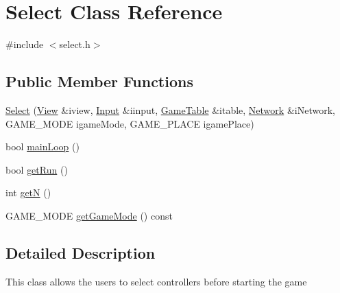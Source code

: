 \hypertarget{class_select}{\section{Select Class Reference}
\label{class_select}
}


{\ttfamily \#include $<$select.\-h$>$}

\subsection*{Public Member Functions}
\begin{DoxyCompactItemize}
\item 
\hyperlink{class_select_a690e07f6c8de112fda9d8a586faf0c26}{Select} (\hyperlink{class_view}{View} \&iview, \hyperlink{class_input}{Input} \&iinput, \hyperlink{class_game_table}{Game\-Table} \&itable, \hyperlink{class_network}{Network} \&i\-Network, G\-A\-M\-E\-\_\-\-M\-O\-D\-E igame\-Mode, G\-A\-M\-E\-\_\-\-P\-L\-A\-C\-E igame\-Place)
\item 
bool \hyperlink{class_select_a59168f64ef8318b41ed37206fd12342e}{main\-Loop} ()
\item 
bool \hyperlink{class_select_a6596137a2f847b8d4f45f27a2b0cb47d}{get\-Run} ()
\item 
int \hyperlink{class_select_a5c032e93122841a71976e53f9d09a217}{get\-N} ()
\item 
G\-A\-M\-E\-\_\-\-M\-O\-D\-E \hyperlink{class_select_a914cea4278472e7c73642ddf61c8d0d4}{get\-Game\-Mode} () const 
\end{DoxyCompactItemize}


\subsection{Detailed Description}
This class allows the users to select controllers before starting the game 

